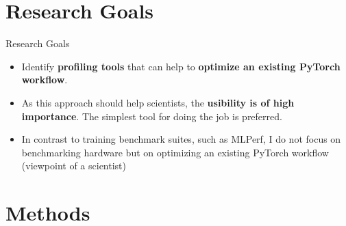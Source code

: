 \documentclass[compress,aspectratio=169]{beamer}
\begin{document}
\section{Research Goals}
\sectionIntroHidden
\begin{frame}{Research Goals}

\begin{itemize}
    \item Identify \textbf{profiling tools} that can help to \textbf{optimize an existing PyTorch workflow}.
    \item As this approach should help scientists, the \textbf{usibility is of high importance}. The simplest tool for doing the job is preferred.
    \item In contrast to training benchmark suites, such as MLPerf, I do not focus on benchmarking hardware but on optimizing an existing PyTorch workflow (viewpoint of a scientist)
\end{itemize}

\end{frame}

\section{Methods}
\sectionIntroHidden %
\end{document}
